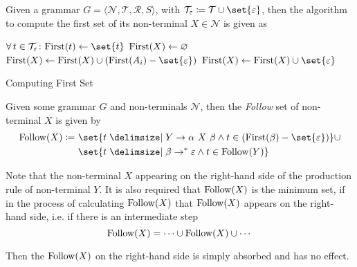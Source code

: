 \begin{definition}
    Given a grammar $G = \langle \mathcal{N}, \mathcal{T}, \mathcal{R}, S \rangle$, with $\mathcal{T}_\varepsilon \coloneq \mathcal{T} \cup \set{\varepsilon}$, then the algorithm to compute the first set of its non-terminal $X \in \mathcal{N}$ is given as
    \begin{algorithm}[H]
        \begin{algorithmic}[1]
                \State $\Forall t \in \mathcal{T}_\varepsilon \colon  \First{t} \gets \set{t}$
                \State $\mathrm{First}{(X)} \gets \varnothing$
                        \State $\First{X} \gets \First{X} \cup (\First{A_i} - \set{\varepsilon})$
                            \State {}
                        \EndIf
                    \EndFor
                    \State $\First{X} \gets \First{X} \cup \set{\varepsilon}$ 
                \EndFor
                \State {}
            \EndProcedure
        \end{algorithmic}
        \caption{Computing First Set}
        \label{prog:compute-first-set}
    \end{algorithm}
\end{definition}

\begin{definition}
    Given some grammar $G$ and non-terminals $\mathcal{N}$, then the \textit{Follow} set of non-terminal $X$ is given by
    \begin{equation}
        \begin{split}
            \Follow{X} \coloneqq &\ \set{ t \given Y \to \alpha\ X\ \beta \land t \in (\First{\beta} - \set{\varepsilon}) } 
            \cup \\ &\ \set{ t \given \beta \to^\ast \varepsilon \land t \in \Follow{Y} }
        \end{split}
    \end{equation}
    
    Note that the non-terminal $X$ appearing on the right-hand side of the production rule of non-terminal $Y$. It is also required that $\mathrm{Follow}{(X)}$ is the minimum set, if in the process of calculating $\mathrm{Follow}{(X)}$ that $\mathrm{Follow}{(X)}$ appears on the right-hand side, i.e. if there is an intermediate step
    \begin{equation}
        \mathrm{Follow}{(X)} = \cdots \cup \mathrm{Follow}{(X)} \cup \cdots
    \end{equation}
    
    Then the $\mathrm{Follow}{(X)}$ on the right-hand side is simply absorbed and has no effect.
\end{definition}

